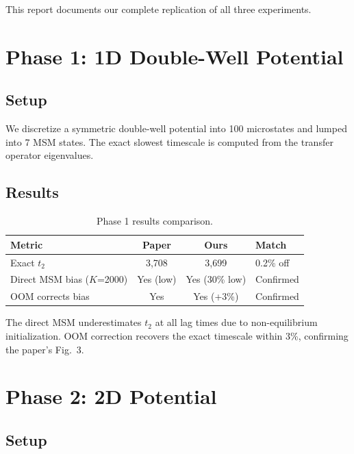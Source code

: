 \documentclass[11pt,a4paper]{article}
\begin{document}
This report documents our complete replication of all three experiments.

\section{Phase 1: 1D Double-Well Potential}

\subsection{Setup}

We discretize a symmetric double-well potential into 100 microstates and lumped into 7 MSM states. The exact slowest timescale is computed from the transfer operator eigenvalues.

\subsection{Results}

\begin{table}[H]
\centering
\caption{Phase 1 results comparison.}
\begin{tabular}{lccl}
\toprule
Metric & Paper & Ours & Match \\
\midrule
Exact $t_2$ & 3{,}708 & 3{,}699 & 0.2\% off \\
Direct MSM bias ($K$=2000) & Yes (low) & Yes (30\% low) & Confirmed \\
OOM corrects bias & Yes & Yes (+3\%) & Confirmed \\
\bottomrule
\end{tabular}
\end{table}

The direct MSM underestimates $t_2$ at all lag times due to non-equilibrium initialization. OOM correction recovers the exact timescale within 3\%, confirming the paper's Fig.~3.

\section{Phase 2: 2D Potential}

\subsection{Setup}
\end{document}
